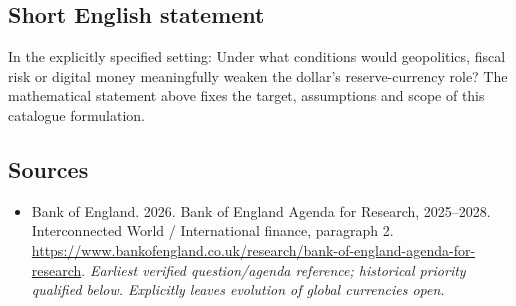 \documentclass[11pt]{article}
\begin{document}
\subsection{Short English statement}
In the explicitly specified setting: Under what conditions would geopolitics, fiscal risk or digital money meaningfully weaken the dollar’s reserve-currency role? The mathematical statement above fixes the target, assumptions and scope of this catalogue formulation.

\subsection{Sources}
\begin{itemize}\raggedright
\item[\textnormal{[S1]}]\hypertarget{source:30007616:1}{} Bank of England. 2026. Bank of England Agenda for Research, 2025–2028. Interconnected World / International finance, paragraph 2.
\url{https://www.bankofengland.co.uk/research/bank-of-england-agenda-for-research}.
{\small\textit{Earliest verified question/agenda reference; historical priority qualified below. Explicitly leaves evolution of global currencies open.}}
\end{itemize}
\end{document}
